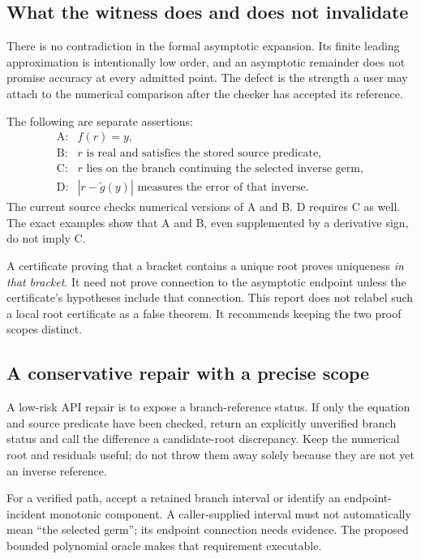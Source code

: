 \documentclass[11pt,letterpaper]{article}
\begin{document}
\subsection{What the witness does and does not invalidate}

There is no contradiction in the formal asymptotic expansion. Its finite leading approximation is intentionally low order, and an asymptotic remainder does not promise accuracy at every admitted point. The defect is the strength a user may attach to the numerical comparison after the checker has accepted its reference.

The following are separate assertions:
\[
\begin{array}{ll}
\text{A:}& f(r)=y,\\
\text{B:}& r\text{ is real and satisfies the stored source predicate},\\
\text{C:}& r\text{ lies on the branch continuing the selected inverse germ},\\
\text{D:}& |r-\widetilde g(y)|\text{ measures the error of that inverse}.
\end{array}
\]
The current source checks numerical versions of A and B. D requires C as well. The exact examples show that A and B, even supplemented by a derivative sign, do not imply C.

A certificate proving that a bracket contains a unique root proves uniqueness \emph{in that bracket}. It need not prove connection to the asymptotic endpoint unless the certificate's hypotheses include that connection. This report does not relabel such a local root certificate as a false theorem. It recommends keeping the two proof scopes distinct.

\subsection{A conservative repair with a precise scope}
\label{sec:branchrepair}

A low-risk API repair is to expose a branch-reference status. If only the equation and source predicate have been checked, return an explicitly unverified branch status and call the difference a candidate-root discrepancy. Keep the numerical root and residuals useful; do not throw them away solely because they are not yet an inverse reference.

For a verified path, accept a retained branch interval or identify an endpoint-incident monotonic component. A caller-supplied interval must not automatically mean ``the selected germ''; its endpoint connection needs evidence. The proposed bounded polynomial oracle makes that requirement executable.
\end{document}
